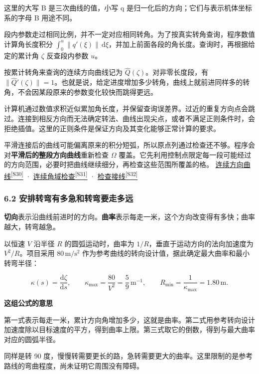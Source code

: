 \documentclass[12pt,a4paper]{article}
\numberwithin{equation}{topic}
\newcommand{\sourceref}[2]{\hyperlink{source-#1}{#2\textsuperscript{[#1]}}}
\begin{document}
这里的大写 B 是三次曲线的值，小写 q 是归一化后的方向；它们与表示机体坐标系的字母 B 用途不同。


段内参数走过相同比例，并不一定对应相同转角。为了按真实转角查询，程序数值计算角长度积分 \(\int_0^u\|q'(\xi)\|\,\mathrm d\xi\)，并加上前面各段的角长度。查询时，再根据给定的累计角 \(\zeta\) 反查段内参数 \(u\)。

按累计转角来查询的连续方向曲线记为 \(\widehat Q(\zeta)\)。对非零长度段，有 \(\|\widehat Q'(\zeta)\|=1\)。也就是说，给定进度增加多少转角，曲线上就前进同样多的转角，不会因某段原来的参数变化较快而跳得更远。

计算机通过数值求积近似累加角长度，并保留查询误差界。过近的重复方向点会跳过。连接到相反方向而无法确定转法、曲线出现尖点，或者不满足正则条件时，会拒绝插值。这里的正则条件是保证方向及其变化能够正常计算的要求。

平滑连接后的曲线可能偏离原来的积分短弧，所以原点列通过检查还不够。程序会对\textbf{平滑后的整段方向曲线}重新检查 \(\Omega\) 覆盖。它先利用控制点限定每一段可能经过的方向范围，必要时把曲线继续细分，再检查这些范围所覆盖的格。 \sourceref{S30}{连续方向曲线} · \sourceref{S31}{连续角域检查} · \sourceref{S32}{检查接线}

\subsubsection*{6.2 安排转弯有多急和转弯要走多远}

\textbf{切向}表示沿曲线前进时的方向。\textbf{曲率}表示每走一米，这个方向改变得有多快；曲率越大，转弯越急。

以恒速 \(V\) 沿半径 \(R\) 的圆弧运动时，曲率为 \(1/R\)，垂直于运动方向的法向加速度为 \(V^2/R\)。项目采用 \(80\,\mathrm{m/s^2}\) 作为参考曲线的转向设计值，据此确定最大曲率和最小转弯半径：

\begin{equation}
\label{eq:curvature}
\kappa(s)=\frac{\mathrm d\zeta}{\mathrm ds},\qquad
\kappa_{\max}=\frac{80}{V^2}=\frac59\,\mathrm{m^{-1}},
\qquad
R_{\min}=\frac{1}{\kappa_{\max}}=1.80\,\mathrm m.
\end{equation}

\noindent\textbf{这组公式的意思}\par\nobreak
第一式表示每走一米，累计方向角增加多少，这就是曲率。第二式用参考转向设计加速度除以目标速度的平方，得到曲率上限。第三式取它的倒数，得到与最大曲率对应的圆弧半径。

同样是转 90 度，慢慢转需要更长的路，急转需要更大的曲率。这里限制的是参考路线的弯曲程度，尚未证明它周围没有障碍。
\end{document}
